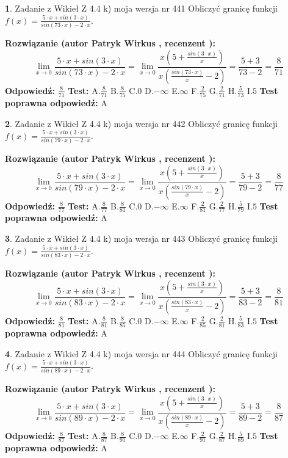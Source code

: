 \documentclass[12pt, a4paper]{article}
\theoremstyle{definition} %
\newtheorem{zad}{}
\newcommand{\zadStart}[1]{\begin{zad}#1\newline}
\newcommand{\zadStop}{\end{zad}}
\newcommand{\rozwStart}[2]{\noindent \textbf{Rozwiązanie (autor #1 , recenzent #2): }\newline}
\newcommand{\rozwStop}{\newline}
\newcommand{\odpStart}{\noindent \textbf{Odpowiedź:}\newline}
\newcommand{\odpStop}{\newline}
\newcommand{\testStart}{\noindent \textbf{Test:}\newline}
\newcommand{\testStop}{\newline}
\newcommand{\kluczStart}{\noindent \textbf{Test poprawna odpowiedź:}\newline}
\newcommand{\kluczStop}{\newline}
\begin{document}
\zadStart{Zadanie z Wikieł Z 4.4 k) moja wersja nr 441}
Obliczyć granicę funkcji $f(x)=\frac{5\cdot x +sin(3\cdot x)}{sin(73\cdot x) -2\cdot x}$.
\zadStop
\rozwStart{Patryk Wirkus}{}
$$\lim\limits_{x\to 0}\frac{5\cdot x +sin(3\cdot x)}{sin(73\cdot x) -2\cdot x}
=\lim\limits_{x\to 0}\frac{x(5+\frac{sin(3\cdot x)}{x})}{x(\frac{sin(73\cdot x)}{x}-2)}
=\frac{5+3}{73-2} = \frac{8}{71}$$
\rozwStop
\odpStart
$\frac{8}{71}$
\odpStop
\testStart
A.$\frac{8}{71}$
B.$\frac{8}{75}$
C.$0$
D.$-\infty$
E.$\infty$
F.$\frac{2}{75}$
G.$\frac{2}{71}$
H.$\frac{5}{73}$
I.$5$
\testStop
\kluczStart
A
\kluczStop



\zadStart{Zadanie z Wikieł Z 4.4 k) moja wersja nr 442}
Obliczyć granicę funkcji $f(x)=\frac{5\cdot x +sin(3\cdot x)}{sin(79\cdot x) -2\cdot x}$.
\zadStop
\rozwStart{Patryk Wirkus}{}
$$\lim\limits_{x\to 0}\frac{5\cdot x +sin(3\cdot x)}{sin(79\cdot x) -2\cdot x}
=\lim\limits_{x\to 0}\frac{x(5+\frac{sin(3\cdot x)}{x})}{x(\frac{sin(79\cdot x)}{x}-2)}
=\frac{5+3}{79-2} = \frac{8}{77}$$
\rozwStop
\odpStart
$\frac{8}{77}$
\odpStop
\testStart
A.$\frac{8}{77}$
B.$\frac{8}{81}$
C.$0$
D.$-\infty$
E.$\infty$
F.$\frac{2}{81}$
G.$\frac{2}{77}$
H.$\frac{5}{79}$
I.$5$
\testStop
\kluczStart
A
\kluczStop



\zadStart{Zadanie z Wikieł Z 4.4 k) moja wersja nr 443}
Obliczyć granicę funkcji $f(x)=\frac{5\cdot x +sin(3\cdot x)}{sin(83\cdot x) -2\cdot x}$.
\zadStop
\rozwStart{Patryk Wirkus}{}
$$\lim\limits_{x\to 0}\frac{5\cdot x +sin(3\cdot x)}{sin(83\cdot x) -2\cdot x}
=\lim\limits_{x\to 0}\frac{x(5+\frac{sin(3\cdot x)}{x})}{x(\frac{sin(83\cdot x)}{x}-2)}
=\frac{5+3}{83-2} = \frac{8}{81}$$
\rozwStop
\odpStart
$\frac{8}{81}$
\odpStop
\testStart
A.$\frac{8}{81}$
B.$\frac{8}{85}$
C.$0$
D.$-\infty$
E.$\infty$
F.$\frac{2}{85}$
G.$\frac{2}{81}$
H.$\frac{5}{83}$
I.$5$
\testStop
\kluczStart
A
\kluczStop



\zadStart{Zadanie z Wikieł Z 4.4 k) moja wersja nr 444}
Obliczyć granicę funkcji $f(x)=\frac{5\cdot x +sin(3\cdot x)}{sin(89\cdot x) -2\cdot x}$.
\zadStop
\rozwStart{Patryk Wirkus}{}
$$\lim\limits_{x\to 0}\frac{5\cdot x +sin(3\cdot x)}{sin(89\cdot x) -2\cdot x}
=\lim\limits_{x\to 0}\frac{x(5+\frac{sin(3\cdot x)}{x})}{x(\frac{sin(89\cdot x)}{x}-2)}
=\frac{5+3}{89-2} = \frac{8}{87}$$
\rozwStop
\odpStart
$\frac{8}{87}$
\odpStop
\testStart
A.$\frac{8}{87}$
B.$\frac{8}{91}$
C.$0$
D.$-\infty$
E.$\infty$
F.$\frac{2}{91}$
G.$\frac{2}{87}$
H.$\frac{5}{89}$
I.$5$
\testStop
\kluczStart
A
\kluczStop
\end{document}
